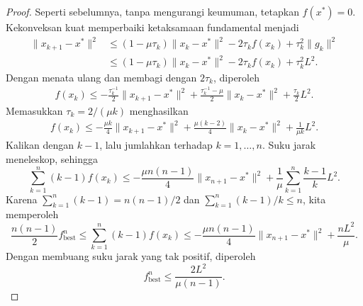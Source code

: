 \begin{proof}
    Seperti sebelumnya, tanpa mengurangi keumuman, tetapkan \(f(x^*)=0\). Kekonveksan kuat memperbaiki ketaksamaan fundamental menjadi
    \begin{equation}
        \begin{aligned}
            \|x_{k+1}-x^*\|^2
            &\leq (1-\mu\tau_k)\|x_k- x^*\|^2 - 2\tau_k f(x_k) + \tau_k^2\|g_k\|^2\\
            &\leq (1-\mu\tau_k)\|x_k- x^*\|^2 - 2\tau_k f(x_k) + \tau_k^2L^2.
        \end{aligned}
    \end{equation}
    Dengan menata ulang dan membagi dengan \(2\tau_k\), diperoleh
    \begin{equation}
        \begin{aligned}
            f(x_k)
            \leq -\frac{\tau_k^{-1}}{2}\|x_{k+1}-x^*\|^2
            + \frac{\tau_k^{-1}-\mu}{2}\|x_k- x^*\|^2
            + \frac{\tau_k}{2}L^2.
        \end{aligned}
    \end{equation}
    Memasukkan \(\tau_k = 2/(\mu k)\) menghasilkan
    \begin{equation}
        \begin{aligned}
            f(x_k)
            \leq -\frac{\mu k}{4} \|x_{k+1}-x^*\|^2
            + \frac{\mu(k-2)}{4}\|x_k- x^*\|^2
            + \frac{1}{\mu k}L^2.
        \end{aligned}
    \end{equation}
    Kalikan dengan \(k-1\), lalu jumlahkan terhadap \(k=1,\dots,n\). Suku jarak meneleskop, sehingga
    \begin{equation}
        \sum_{k=1}^{n} (k-1)f(x_k)
        \leq -\frac{\mu n(n-1)}{4} \|x_{n+1}-x^*\|^2
        + \frac{1}{\mu}\sum_{k=1}^{n}\frac{k-1}{k}L^2.
    \end{equation}
    Karena \(\sum_{k=1}^{n} (k-1)=n(n-1)/2\) dan
    \(\sum_{k=1}^{n}(k-1)/k\leq n\), kita memperoleh
    \begin{equation}\label{subgradient:eq:strongly}
        \frac{n(n-1)}{2} f^n_{\mathrm{best}}
        \leq \sum_{k=1}^{n} (k-1)f(x_k)
        \leq -\frac{\mu n(n-1)}{4} \|x_{n+1}-x^*\|^2
        + \frac{nL^2}{\mu}.
    \end{equation}
    Dengan membuang suku jarak yang tak positif, diperoleh
    \begin{equation}
        f^n_{\mathrm{best}} \leq \frac{2L^2}{\mu(n-1)}.
    \end{equation}


\end{proof}
